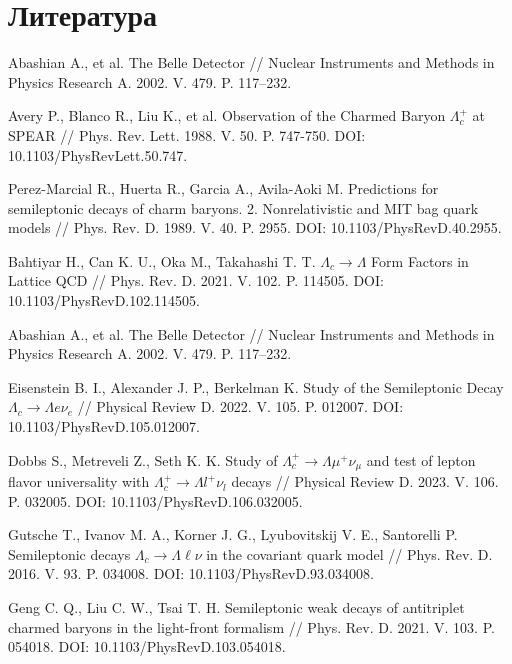 \section{Литература}

\begin{thebibliography}{99}

    Abashian A., et al. The Belle Detector // Nuclear Instruments and Methods in Physics Research A. 2002. V. 479. P. 117–232.

    Avery P., Blanco R., Liu K., et al. Observation of the Charmed Baryon $\Lambda^+_c$ at SPEAR // Phys. Rev. Lett. 1988. V. 50. P. 747-750. DOI: 10.1103/PhysRevLett.50.747.

    Perez-Marcial R., Huerta R., Garcia A., Avila-Aoki M. Predictions for semileptonic decays of charm baryons. 2. Nonrelativistic and MIT bag quark models // Phys. Rev. D. 1989. V. 40. P. 2955. DOI: 10.1103/PhysRevD.40.2955.
    
    Bahtiyar H., Can K. U., Oka M., Takahashi T. T. $\Lambda_c \to \Lambda$ Form Factors in Lattice QCD // Phys. Rev. D. 2021. V. 102. P. 114505. DOI: 10.1103/PhysRevD.102.114505.    

    Abashian A., et al. The Belle Detector // Nuclear Instruments and Methods in Physics Research A. 2002. V. 479. P. 117–232.

    Eisenstein B. I., Alexander J. P., Berkelman K. Study of the Semileptonic Decay $\Lambda_c \rightarrow \Lambda e \nu_e$ // Physical Review D. 2022. V. 105. P. 012007. DOI: 10.1103/PhysRevD.105.012007.
    
    Dobbs S., Metreveli Z., Seth K. K. Study of $\Lambda_c^+ \rightarrow \Lambda \mu^+ \nu_{\mu}$ and test of lepton flavor universality with $\Lambda_c^+ \rightarrow \Lambda l^+ \nu_l$ decays // Physical Review D. 2023. V. 106. P. 032005. DOI: 10.1103/PhysRevD.106.032005.
    
    Gutsche T., Ivanov M. A., Korner J. G., Lyubovitskij V. E., Santorelli P. Semileptonic decays $\Lambda_c \to \Lambda \ell \nu$ in the covariant quark model // Phys. Rev. D. 2016. V. 93. P. 034008. DOI: 10.1103/PhysRevD.93.034008.    

    Geng C. Q., Liu C. W., Tsai T. H. Semileptonic weak decays of antitriplet charmed baryons in the light-front formalism // Phys. Rev. D. 2021. V. 103. P. 054018. DOI: 10.1103/PhysRevD.103.054018.
    

\end{thebibliography}
